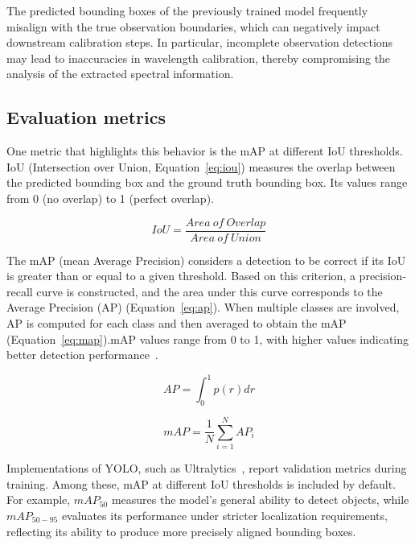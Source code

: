 \documentclass[runningheads]{llncs}
\begin{document}
The predicted bounding boxes of the previously trained model frequently misalign with the true observation boundaries, which can negatively impact downstream calibration steps. In particular, incomplete observation detections may lead to inaccuracies in wavelength calibration, thereby compromising the analysis of the extracted spectral information. 

\subsection{Evaluation metrics}

One metric that highlights this behavior is the mAP at different IoU thresholds. IoU (Intersection over Union, Equation~\ref{eq:iou}) measures the overlap between the predicted bounding box and the ground truth bounding box. Its values range from 0 (no overlap) to 1 (perfect overlap).

\begin{equation}
    IoU = \frac{Area\ of\ Overlap}{Area\ of\ Union}
    \label{eq:iou}
\end{equation}

The mAP (mean Average Precision) considers a detection to be correct if its IoU is greater than or equal to a given threshold. Based on this criterion, a precision-recall curve is constructed, and the area under this curve corresponds to the Average Precision (AP) (Equation~\ref{eq:ap}). When multiple classes are involved, AP is computed for each class and then averaged to obtain the mAP (Equation~\ref{eq:map}).\@ mAP values range from 0 to 1, with higher values indicating better detection performance~\cite{everingham2010pascal}. %

\begin{equation}
    AP = \int_{0}^{1} p(r) dr
    \label{eq:ap}
\end{equation}

\begin{equation}
    mAP = \frac{1}{N} \sum_{i=1}^{N} AP_i
    \label{eq:map}
\end{equation}

Implementations of YOLO, such as Ultralytics~\cite{yolo26_ultralytics}, report validation metrics during training. Among these, mAP at different IoU thresholds is included by default. For example, $mAP_{50}$ measures the model’s general ability to detect objects, while $mAP_{50-95}$ evaluates its performance under stricter localization requirements, reflecting its ability to produce more precisely aligned bounding boxes.
\end{document}
